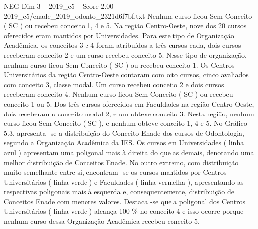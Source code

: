\begin{textsample}{NEG Dim 3 – 2019\_c5 – Score 2.00 – 2019\_c5/enade\_2019\_odonto\_2321d6f7bf.txt}
Nenhum curso ficou Sem Conceito ( SC ) ou recebeu conceito 1, 4 e 5.
Na região Centro-Oeste, nove dos 20 cursos oferecidos eram mantidos por Universidades.
Para este tipo de Organização Acadêmica, os conceitos 3 e 4 foram atribuídos a três cursos cada, dois cursos receberam conceito 2 e um curso recebeu conceito 5.
Nesse tipo de organização, nenhum curso ficou Sem Conceito ( SC ) ou recebeu conceito 1.
Os Centros Universitários da região Centro-Oeste contaram com oito cursos, cinco avaliados com conceito 3, classe modal.
Um curso recebeu conceito 2 e dois cursos receberam conceito 4.
Nenhum curso ficou Sem Conceito ( SC ) ou recebeu conceito 1 ou 5.
Dos três cursos oferecidos em Faculdades na região Centro-Oeste, dois receberam o conceito modal 2, e um obteve conceito 3.
Nesta região, nenhum curso ficou Sem Conceito ( SC ), e nenhum obteve conceito 1, 4 e 5.
No Gráfico 5.3, apresenta -se a distribuição do Conceito Enade dos cursos de Odontologia, segundo a Organização Acadêmica da IES.
Os cursos em Universidades ( linha azul ) apresentam uma poligonal mais à direita do que as demais, denotando uma melhor distribuição de Conceitos Enade.
No outro extremo, com distribuição muito semelhante entre si, encontram -se os cursos mantidos por Centros Universitários ( linha verde ) e Faculdades ( linha vermelha ), apresentando as respectivas poligonais mais à esquerda e, consequentemente, distribuição de Conceitos Enade com menores valores.
Destaca -se que a poligonal dos Centros Universitários ( linha verde ) alcança 100 \% no conceito 4 e isso ocorre porque nenhum curso dessa Organização Acadêmica recebeu conceito 5.

\end{textsample}
